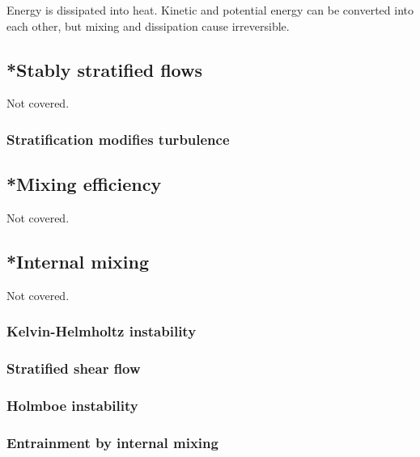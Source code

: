 Energy is dissipated into heat. Kinetic and potential energy can be converted into each other, but mixing and dissipation cause irreversible. 

\subsection{*Stably stratified flows}
Not covered.
\subsubsection{Stratification modifies turbulence}

\subsection{*Mixing efficiency}
Not covered.

\subsection{*Internal mixing}
Not covered. 
\subsubsection{Kelvin-Helmholtz instability}
\subsubsection{Stratified shear flow}
\subsubsection{Holmboe instability}
\subsubsection{Entrainment by internal mixing}
